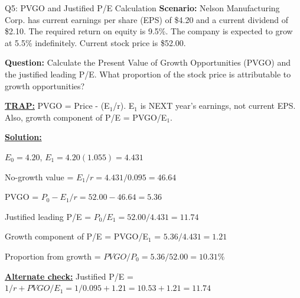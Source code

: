 \documentclass{beamer}
\renewcommand{\scriptsize}{\fontsize{6pt}{7pt}\selectfont}
\begin{document}
	\begin{frame}{Q5: PVGO and Justified P/E Calculation}
		\scriptsize
		\textbf{Scenario:} Nelson Manufacturing Corp. has current earnings per share (EPS) of \$4.20 and a current dividend of \$2.10. The required return on equity is 9.5\%. The company is expected to grow at 5.5\% indefinitely. Current stock price is \$52.00.
		
		\textbf{Question:} Calculate the Present Value of Growth Opportunities (PVGO) and the justified leading P/E. What proportion of the stock price is attributable to growth opportunities?
		
		\vspace{2pt}
		\underline{\textbf{TRAP:}} PVGO = Price - (E$_1$/r). E$_1$ is NEXT year's earnings, not current EPS. Also, growth component of P/E = PVGO/E$_1$.
		
		\vspace{4pt}
		\underline{\textbf{Solution:}}
		
		$E_0 = 4.20$, $E_1 = 4.20(1.055) = 4.431$
		
		No-growth value = $E_1/r = 4.431/0.095 = 46.64$
		
		\vspace{2pt}
		PVGO = $P_0 - E_1/r = 52.00 - 46.64 = 5.36$
		
		\vspace{2pt}
		Justified leading P/E = $P_0/E_1 = 52.00/4.431 = 11.74$
		
		\vspace{2pt}
		Growth component of P/E = PVGO/E$_1$ = $5.36/4.431 = 1.21$
		
		\vspace{2pt}
		Proportion from growth = $PVGO/P_0 = 5.36/52.00 = 10.31\%$
		
		\vspace{2pt}
		\underline{\textbf{Alternate check:}} Justified P/E = $1/r + PVGO/E_1 = 1/0.095 + 1.21 = 10.53 + 1.21 = 11.74$
	\end{frame}
	
\end{document}
